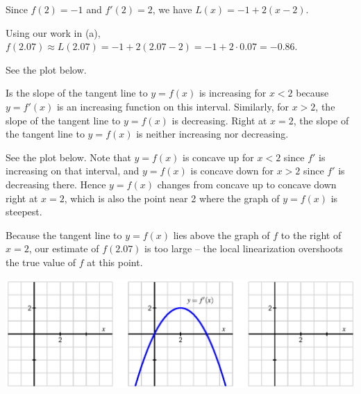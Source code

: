 \begin{activitySolution}
\ba
	\item Since $f(2) = -1$ and $f'(2) = 2$, we have $L(x) = -1 + 2(x-2)$.
	\item Using our work in (a), $f(2.07) \approx L(2.07) = -1 + 2(2.07-2) = -1 + 2\cdot 0.07 = -0.86$.  
	\item See the plot below.
	\item Is the slope of the tangent line to $y = f(x)$ is increasing for $x < 2$ because $y = f'(x)$ is an increasing function on this interval.  Similarly, for $x > 2$, the slope of the tangent line to $y = f(x)$ is decreasing.  Right at $x = 2$, the slope of the tangent line to $y = f(x)$ is neither increasing nor decreasing.
	\item See the plot below.  Note that $y = f(x)$ is concave up for $x < 2$ since $f'$ is increasing on that interval, and $y = f(x)$ is concave down for $x > 2$ since $f'$ is decreasing there.  Hence $y = f(x)$ changes from concave up to concave down right at $x = 2$, which is also the point near 2 where the graph of $y = f(x)$ is steepest.
	\item Because the tangent line to $y = f(x)$ lies above the graph  of $f$ to the right of $x = 2$, our estimate of $f(2.07)$ is too large -- the local linearization overshoots the true value of $f$ at this point.
\ea

\begin{center}
\includegraphics{figures/1_8_Act2.eps}
\end{center}
\end{activitySolution}
\aftera